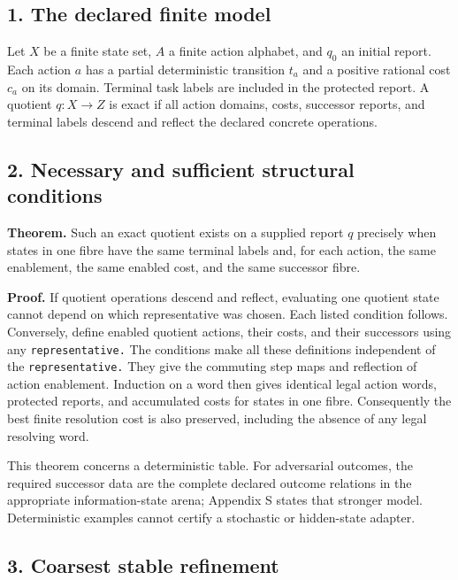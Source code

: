 \documentclass[
  11pt,
]{article}
\begin{document}
\subsection{1. The declared finite
model}\label{the-declared-finite-model}

Let \(X\) be a finite state set, \(A\) a finite action alphabet, and
\(q_0\) an initial report. Each action \(a\) has a partial deterministic
transition \(t_a\) and a positive rational cost \(c_a\) on its domain.
Terminal task labels are included in the protected report. A quotient
\(q:X\to Z\) is exact if all action domains, costs, successor reports,
and terminal labels descend and reflect the declared concrete
operations.

\subsection{2. Necessary and sufficient structural
conditions}\label{necessary-and-sufficient-structural-conditions}

\textbf{Theorem.} Such an exact quotient exists on a supplied report
\(q\) precisely when states in one fibre have the same terminal labels
and, for each action, the same enablement, the same enabled cost, and
the same successor fibre.

\textbf{Proof.} If quotient operations descend and reflect, evaluating
one quotient state cannot depend on which representative was chosen.
Each listed condition follows. Conversely, define enabled quotient
actions, their costs, and their successors using any
\nolinkurl{representative.} The conditions make all these definitions
independent of the \nolinkurl{representative.} They give the commuting
step maps and reflection of action enablement. Induction on a word then
gives identical legal action words, protected reports, and accumulated
costs for states in one fibre. Consequently the best finite resolution
cost is also preserved, including the absence of any legal resolving
word.

This theorem concerns a deterministic table. For adversarial outcomes,
the required successor data are the complete declared outcome relations
in the appropriate information-state arena; Appendix S states that
stronger model. Deterministic examples cannot certify a stochastic or
hidden-state adapter.

\subsection{3. Coarsest stable
refinement}\label{coarsest-stable-refinement}
\end{document}
